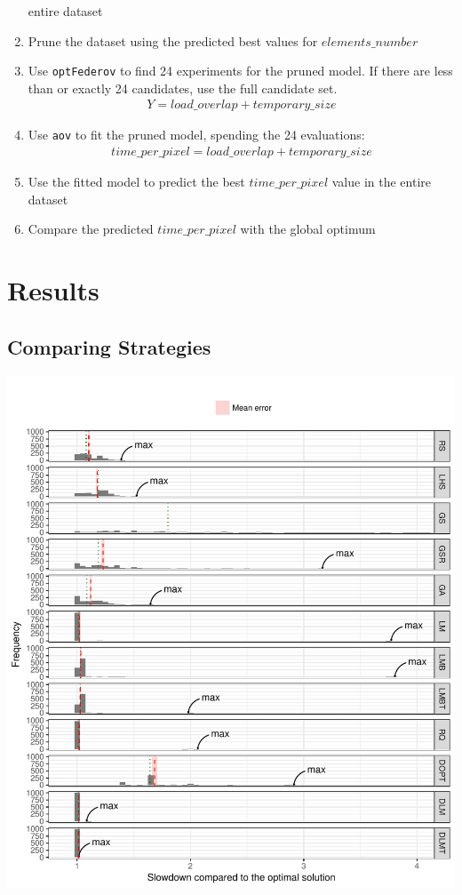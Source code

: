 \documentclass[final,12pt,a4paper]{article}
\begin{document}
\begin{enumerate}
entire dataset
\item Prune the dataset using the predicted best values for \(elements\_number\)
\item Use \texttt{optFederov} to find 24 experiments for the pruned model. If there are less
than or exactly 24 candidates, use the full candidate set.
\begin{align*}
    Y = load\_overlap + temporary\_size
\end{align*}
\item Use \texttt{aov} to fit the pruned model, spending the 24 evaluations:
\begin{align*}
      time\_per\_pixel = load\_overlap + temporary\_size
\end{align*}
\item Use the fitted model to predict the best \(time\_per\_pixel\) value in the
entire dataset
\item Compare the predicted \(time\_per\_pixel\) with the global optimum
\end{enumerate}
\section{Results}
\label{sec:orgd36cd9c}
\subsection{Comparing Strategies}
\label{sec:orgd589665}
\begin{center}
\includegraphics[width=.9\linewidth]{../img/comparison_histogram.pdf}
\end{center}
\end{document}
